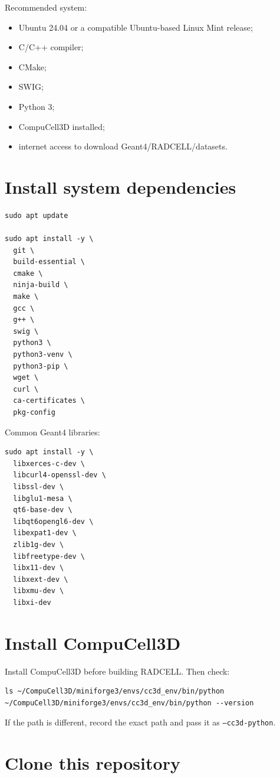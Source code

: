 \documentclass[11pt,a4paper,twoside,pdftex]{refrep}
\begin{document}
Recommended system:

\begin{itemize}
  \item Ubuntu 24.04 or a compatible Ubuntu-based Linux Mint release;
  \item C/C++ compiler;
  \item CMake;
  \item SWIG;
  \item Python 3;
  \item CompuCell3D installed;
  \item internet access to download Geant4/RADCELL/datasets.
\end{itemize}

\section{Install system dependencies}

\begin{lstlisting}
sudo apt update

sudo apt install -y \
  git \
  build-essential \
  cmake \
  ninja-build \
  make \
  gcc \
  g++ \
  swig \
  python3 \
  python3-venv \
  python3-pip \
  wget \
  curl \
  ca-certificates \
  pkg-config
\end{lstlisting}

Common Geant4 libraries:

\begin{lstlisting}
sudo apt install -y \
  libxerces-c-dev \
  libcurl4-openssl-dev \
  libssl-dev \
  libglu1-mesa \
  qt6-base-dev \
  libqt6opengl6-dev \
  libexpat1-dev \
  zlib1g-dev \
  libfreetype-dev \
  libx11-dev \
  libxext-dev \
  libxmu-dev \
  libxi-dev
\end{lstlisting}

\section{Install CompuCell3D}

Install CompuCell3D before building RADCELL. Then check:

\begin{lstlisting}
ls ~/CompuCell3D/miniforge3/envs/cc3d_env/bin/python
~/CompuCell3D/miniforge3/envs/cc3d_env/bin/python --version
\end{lstlisting}

If the path is different, record the exact path and pass it as \texttt{--cc3d-python}.

\section{Clone this repository}
\end{document}
